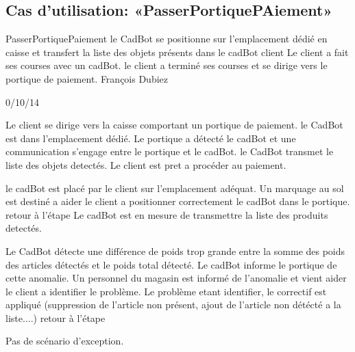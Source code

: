﻿%
\subsection{Cas d'utilisation: «PasserPortiquePAiement» }

\startCU
\nom PasserPortiquePaiement
\but le CadBot se positionne sur l'emplacement dédié en caisse et transfert la liste des objets présents dans le cadBot
\acteur client
\precondition Le client a fait ses courses avec un cadBot.
\declenchement le client a terminé ses courses et se dirige vers le portique de paiement.
\auteur François Dubiez
\date 30/10/14

\nominal %
\startnominal
\etape[SA1] Le client se dirige vers la caisse comportant un portique de paiement.
\etape[RETOUR] le CadBot est dans l'emplacement dédié. Le portique a détecté le cadBot et une communication s'engage entre le portique et le cadBot.
\etape[SA2] le CadBot transmet le liste des objets detectés.
\stopnominal
\postcondition Le client est pret a procéder au paiement.

\alternatifs %
\startalternatif[SA1] %
\startcondition[ModeManuel] 
  \etape le cadBot est placé par le client sur l'emplacement adéquat.
  \etape  Un marquage au sol est destiné a aider le client a positionner correctement le cadBot dans le portique.
  \etape retour à l'étape \in[RETOUR]
\stopcondition
\postcondition Le cadBot est en mesure de transmettre la liste des produits detectés.
\stopalternatif

\startalternatif[SA2]
  \etape Le CadBot détecte une différence de poids trop grande entre la somme des poids des articles détectés et le poids total détecté.
  \etape Le cadBot informe le portique de cette anomalie.
  \etape Un personnel du magasin est informé de l'anomalie et vient aider le client a identifier le problème.
  \etape Le problème etant identifier, le correctif est appliqué (suppression de l'article non présent, ajout de l'article non détécté a la liste....)
  \etape retour à l'étape \in[RETOUR2]
\stopcondition
\stopalternatif

\exception %
Pas de scénario d'exception.
\stopCU
